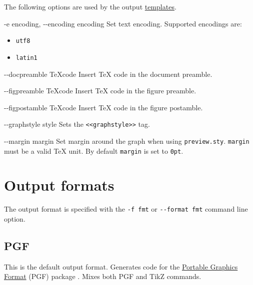 \documentclass[10pt,a4paper,english]{article}
\newcommand{\optionlistlabel}[1]{\bf #1 \hfill}
\newenvironment{optionlist}[1]
{\begin{list}{}
  {\setlength{\labelwidth}{#1}
   \setlength{\rightmargin}{1cm}
   \setlength{\leftmargin}{\rightmargin}
   \addtolength{\leftmargin}{\labelwidth}
   \addtolength{\leftmargin}{\labelsep}
   \renewcommand{\makelabel}{\optionlistlabel}}
}{\end{list}}
\begin{document}
The following options are used by the output \href{\#templates}{templates}.
\begin{optionlist}{3cm}
\item [-e encoding, -{}-encoding encoding]  
Set text encoding. Supported encodings are:
\begin{itemize}
\item {} 
\texttt{utf8}

\item {} 
\texttt{latin1}

\end{itemize}
\item [-{}-docpreamble TeXcode]  
Insert TeX code in the document preamble.
\item [-{}-figpreamble TeXcode]  
Insert TeX code in the figure preamble.
\item [-{}-figpostamble TeXcode]  
Insert TeX code in the figure postamble.
\item [-{}-graphstyle style]  
Sets the \texttt{<{}<graphstyle>{}>} tag.
\item [-{}-margin margin]  
Set margin around the graph when using \texttt{preview.sty}. \texttt{margin} must be a valid TeX unit. By default \texttt{margin} is set to \texttt{0pt}.
\end{optionlist}



\hypertarget{output-formats}{}
\section*{Output formats}
\label{output-formats}

The output format is specified with the \texttt{-f fmt} or  \texttt{-{}-format fmt} command line option.



\hypertarget{pgf}{}
\subsection*{PGF}
\label{pgf}

This is the default output format. Generates code for the \href{http://www.ctan.org/tex-archive/help/Catalogue/entries/pgf.html}{Portable Graphics Format} (PGF) package . Mixes both PGF and TikZ commands.
\end{document}
